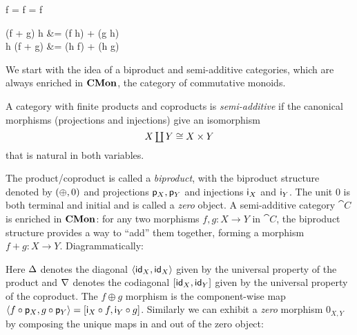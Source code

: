 \begin{salign*}
f \comp \zero = f = \zero \comp f
\end{salign*}
\begin{salign*}
(f + g) \comp h &= (f \comp h) + (g \comp h) \\
h \comp (f + g) &= (h \comp f) + (h \comp g)
\end{salign*}

We start with the idea of a biproduct and semi-additive categories, which are always enriched in $\mathbf{CMon}$, the
category of commutative monoids.

\begin{definition}
\label{def:biproducts:semi-additive}
A category with finite products and coproducts is \emph{semi-additive} if the canonical morphisms (projections
and injections) give an isomorphism
\[\textstyle X \coprod Y \cong X \times Y\] that is natural in both variables.
\end{definition}

The product/coproduct is called a \emph{biproduct}, with the biproduct structure denoted by $(\oplus, 0)$ and
projections $\mathsf{p}_X, \mathsf{p}_Y$ and injections $\mathsf{i}_X$ and $\mathsf{i}_Y$. The unit $0$ is both terminal and
initial and is called a \emph{zero} object. A semi-additive category $\cat{C}$ is enriched in $\mathbf{CMon}$: for any
two morphisms $f, g: X \to Y$ in $\cat{C}$, the biproduct structure provides a way to ``add'' them together,
forming a morphism $f + g: X \to Y$. Diagrammatically:

\begin{center}
\end{center}

Here $\Delta$ denotes the diagonal $\langle \mathsf{id}_X, \mathsf{id}_X\rangle$ given by the universal property of the product and
$\nabla$ denotes the codiagonal $[\mathsf{id}_X, \mathsf{id}_Y]$ given by the universal property of the coproduct.
The $f \oplus g$ morphism is the component-wise map $\langle f \circ \mathsf{p}_X, g \circ \mathsf{p}_Y\rangle =
[\mathsf{i}_X \circ f, \mathsf{i}_Y \circ g]$. Similarly we can exhibit a \emph{zero} morphism $0_{X,Y}$ by
composing the unique maps in and out of the zero object:

\begin{center}
\end{center}

